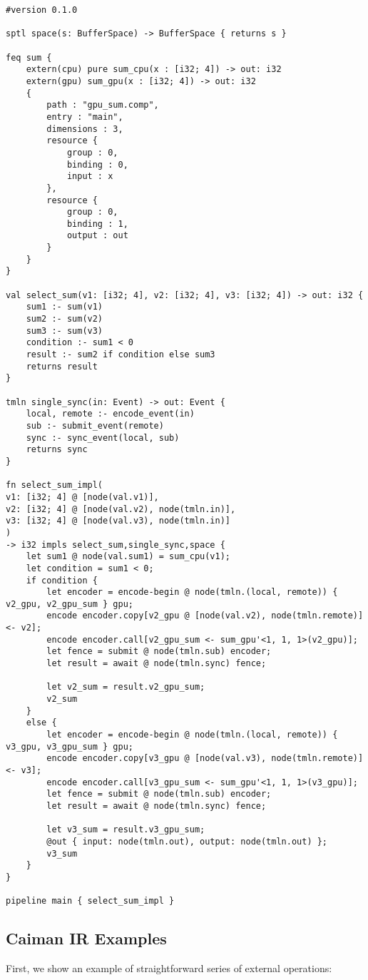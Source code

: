 \begin{lstlisting}
#version 0.1.0

sptl space(s: BufferSpace) -> BufferSpace { returns s }

feq sum {
	extern(cpu) pure sum_cpu(x : [i32; 4]) -> out: i32
	extern(gpu) sum_gpu(x : [i32; 4]) -> out: i32
	{
		path : "gpu_sum.comp",
		entry : "main",
		dimensions : 3,
		resource {
			group : 0,
			binding : 0,
			input : x
		},
		resource {
			group : 0,
			binding : 1,
			output : out
		}
	}
}

val select_sum(v1: [i32; 4], v2: [i32; 4], v3: [i32; 4]) -> out: i32 {
	sum1 :- sum(v1)
	sum2 :- sum(v2)
	sum3 :- sum(v3)
	condition :- sum1 < 0
	result :- sum2 if condition else sum3
	returns result
}

tmln single_sync(in: Event) -> out: Event { 
	local, remote :- encode_event(in)
	sub :- submit_event(remote)
	sync :- sync_event(local, sub)
	returns sync
}

fn select_sum_impl(
v1: [i32; 4] @ [node(val.v1)], 
v2: [i32; 4] @ [node(val.v2), node(tmln.in)], 
v3: [i32; 4] @ [node(val.v3), node(tmln.in)]
) 
-> i32 impls select_sum,single_sync,space {
	let sum1 @ node(val.sum1) = sum_cpu(v1);
	let condition = sum1 < 0;
	if condition {
		let encoder = encode-begin @ node(tmln.(local, remote)) { v2_gpu, v2_gpu_sum } gpu;
		encode encoder.copy[v2_gpu @ [node(val.v2), node(tmln.remote)] <- v2];
		encode encoder.call[v2_gpu_sum <- sum_gpu'<1, 1, 1>(v2_gpu)];
		let fence = submit @ node(tmln.sub) encoder;
		let result = await @ node(tmln.sync) fence;
		
		let v2_sum = result.v2_gpu_sum;
		v2_sum
	}
	else {
		let encoder = encode-begin @ node(tmln.(local, remote)) { v3_gpu, v3_gpu_sum } gpu;
		encode encoder.copy[v3_gpu @ [node(val.v3), node(tmln.remote)] <- v3];
		encode encoder.call[v3_gpu_sum <- sum_gpu'<1, 1, 1>(v3_gpu)];
		let fence = submit @ node(tmln.sub) encoder;
		let result = await @ node(tmln.sync) fence;
		
		let v3_sum = result.v3_gpu_sum;
		@out { input: node(tmln.out), output: node(tmln.out) };
		v3_sum
	}
}

pipeline main { select_sum_impl }
\end{lstlisting}

\subsection{Caiman IR Examples}
\label{subsec:caiman-ir-examples}

First, we show an example of straightforward series of external operations:

